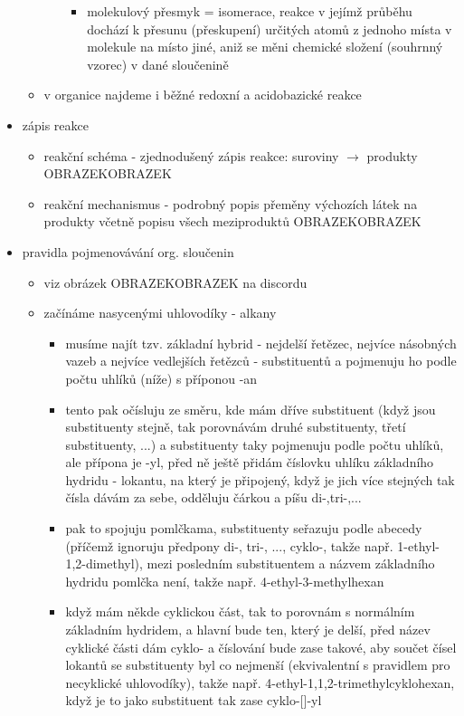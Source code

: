 \documentclass{article}
\begin{document}
\begin{itemize}
\begin{itemize}
\begin{itemize}
\begin{itemize}
        \item molekulový přesmyk = isomerace, reakce v jejímž průběhu dochází k přesunu (přeskupení) určitých atomů z jednoho místa v molekule na místo jiné, aniž se měni chemické složení (souhrnný vzorec) v dané sloučenině
      \end{itemize}
    \end{itemize}
    \item v organice najdeme i běžné redoxní a acidobazické reakce
  \end{itemize}
  \item zápis reakce
  \begin{itemize}
    \item reakční schéma - zjednodušený zápis reakce: suroviny $\rightarrow$ produkty OBRAZEKOBRAZEK
    \item reakční mechanismus - podrobný popis přeměny výchozích látek na produkty včetně popisu všech meziproduktů OBRAZEKOBRAZEK
  \end{itemize}
  \item pravidla pojmenovávání org. sloučenin
  \begin{itemize}
    \item viz obrázek OBRAZEKOBRAZEK na discordu
    \item začínáme nasycenými uhlovodíky - alkany
    \begin{itemize}
      \item musíme najít tzv. základní hybrid - nejdelší řetězec, nejvíce násobných vazeb a nejvíce vedlejších řetězců - substituentů a pojmenuju ho podle počtu uhlíků (níže) s příponou -an
      \item tento pak očísluju ze směru, kde mám dříve substituent (když jsou substituenty stejně, tak porovnávám druhé substituenty, třetí substituenty, ...) a substituenty taky pojmenuju podle počtu uhlíků, ale přípona je -yl, před ně ještě přidám číslovku uhlíku základního hydridu - lokantu, na který je připojený, když je jich více stejných tak čísla dávám za sebe, odděluju čárkou a píšu di-,tri-,...
      \item pak to spojuju pomlčkama, substituenty seřazuju podle abecedy (příčemž ignoruju předpony di-, tri-, ..., cyklo-, takže např. 1-ethyl-1,2-dimethyl), mezi posledním substituentem a názvem základního hydridu pomlčka není, takže např. 4-ethyl-3-methylhexan
      \item když mám někde cyklickou část, tak to porovnám s normálním základním hydridem, a hlavní bude ten, který je delší, před název cyklické části dám cyklo- a číslování bude zase takové, aby součet čísel lokantů se substituenty byl co nejmenší (ekvivalentní s pravidlem pro necyklické uhlovodíky), takže např. 4-ethyl-1,1,2-trimethylcyklohexan, když je to jako substituent tak zase cyklo-[]-yl

\end{itemize}
\end{itemize}
\end{itemize}
\end{document}

